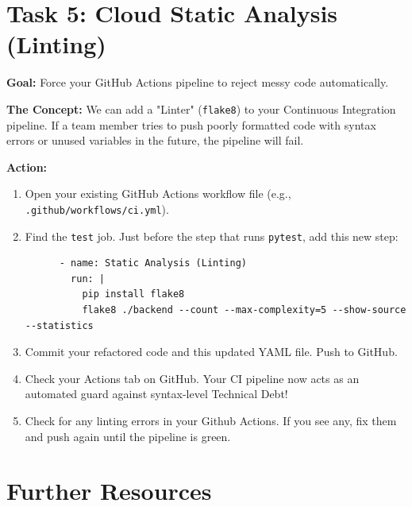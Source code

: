 \documentclass[a4paper,12pt]{article}
\begin{document}

\section*{Task 5: Cloud Static Analysis (Linting)}

\textbf{Goal:} Force your GitHub Actions pipeline to reject messy code automatically.

\textbf{The Concept:} We can add a "Linter" (\texttt{flake8}) to your Continuous Integration pipeline. If a team member tries to push poorly formatted code with syntax errors or unused variables in the future, the pipeline will fail.

\vspace{0.3cm}
\textbf{Action:}
\begin{enumerate}
    \item Open your existing GitHub Actions workflow file (e.g., \texttt{.github/workflows/ci.yml}).
    \item Find the \texttt{test} job. Just before the step that runs \texttt{pytest}, add this new step:
    \begin{verbatim}
      - name: Static Analysis (Linting)
        run: |
          pip install flake8
          flake8 ./backend --count --max-complexity=5 --show-source --statistics
\end{verbatim}
    \item Commit your refactored code and this updated YAML file. Push to GitHub.
    \item Check your Actions tab on GitHub. Your CI pipeline now acts as an automated guard against syntax-level Technical Debt!
    \item Check for any linting errors in your Github Actions. If you see any, fix them and push again until the pipeline is green.
\end{enumerate}


\section*{Further Resources}
\end{document}
